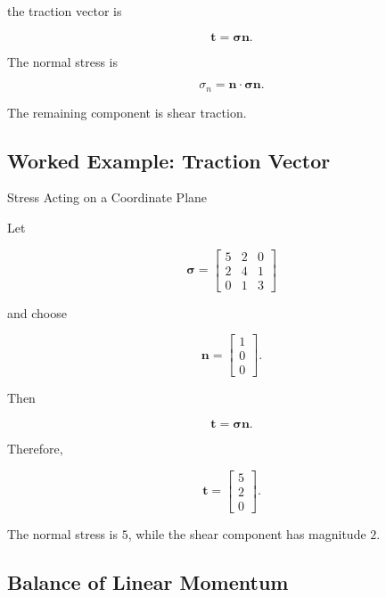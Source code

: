 the traction vector is

\[
\boxed{
\mathbf{t}
=
\boldsymbol{\sigma}\mathbf{n}.
}
\]

The normal stress is

\[
\boxed{
\sigma_n
=
\mathbf{n}\cdot
\boldsymbol{\sigma}\mathbf{n}.
}
\]

The remaining component is shear traction.

\subsection{Worked Example: Traction Vector}
\label{subsec:worked-traction-vector}

\begin{workedexamplebox}{Stress Acting on a Coordinate Plane}

Let

\[
\boldsymbol{\sigma}
=
\begin{bmatrix}
5 & 2 & 0\\
2 & 4 & 1\\
0 & 1 & 3
\end{bmatrix}
\]

and choose

\[
\mathbf{n}
=
\begin{bmatrix}
1\\
0\\
0
\end{bmatrix}.
\]

Then

\[
\mathbf{t}
=
\boldsymbol{\sigma}\mathbf{n}.
\]

Therefore,

\begin{answerbox}
\[
\boxed{
\mathbf{t}
=
\begin{bmatrix}
5\\
2\\
0
\end{bmatrix}.
}
\]
\end{answerbox}

The normal stress is \(5\), while the shear component has magnitude \(2\).

\end{workedexamplebox}

\subsection{Balance of Linear Momentum}
\label{subsec:balance-linear-momentum}

